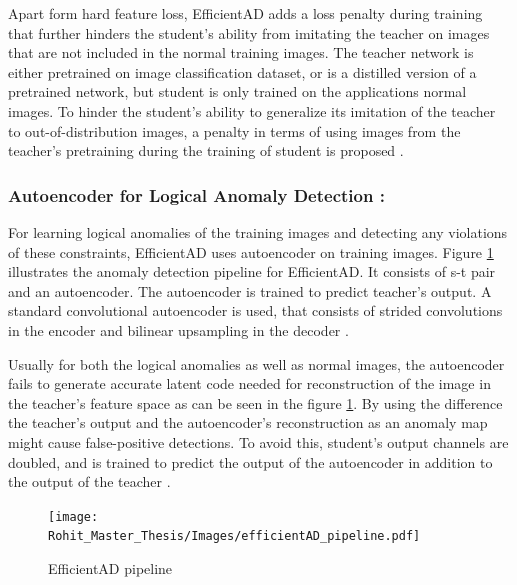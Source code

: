 Apart form hard feature loss, EfficientAD adds a loss penalty during training that further hinders the student's ability from imitating the teacher on images that are not included in the normal training images. The teacher network is either pretrained on image classification dataset, or is a distilled version of a pretrained network, but student is only trained on the applications normal images. To hinder the student's ability to generalize its imitation of the teacher to out-of-distribution images, a penalty in terms of using images from the teacher's pretraining during the training of student is proposed \cite{batzner2024efficientadaccuratevisualanomaly}.

\subsubsection*{Autoencoder for Logical Anomaly Detection :}

For learning logical anomalies of the training images and detecting any violations of these constraints, EfficientAD uses autoencoder on training images. Figure \ref{fig:EfficientAD pipeline} illustrates the anomaly detection pipeline for EfficientAD. It consists of \gls{s-t} pair and an autoencoder. The autoencoder is trained to predict teacher's output. A standard convolutional autoencoder is used, that consists of strided convolutions in the encoder and bilinear upsampling in the decoder \cite{batzner2024efficientadaccuratevisualanomaly}.

Usually for both the logical anomalies as well as normal images, the autoencoder fails to generate accurate latent code needed for reconstruction of the image in the teacher's feature space as can be seen in the figure \ref{fig:EfficientAD pipeline}. By using the difference the teacher's output and the autoencoder's reconstruction as an anomaly map might cause false-positive detections. To avoid this, student's output channels are doubled, and is trained to predict the output of the autoencoder in addition to the output of the teacher \cite{batzner2024efficientadaccuratevisualanomaly}.

\begin{figure}[ht!]
    \centering
    \texttt{[image: Rohit\_Master\_Thesis/Images/efficientAD\_pipeline.pdf]}
    \caption{EfficientAD pipeline}
    \label{fig:EfficientAD pipeline}
\end{figure}

